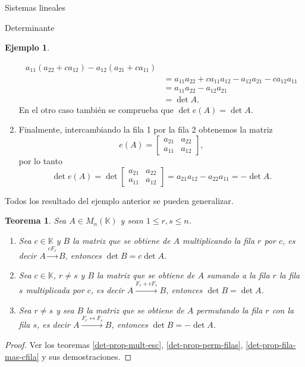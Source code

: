 \documentclass[a4paper,12pt,twoside,spanish]{amsbook}
\newtheorem{teorema}{Teorema}[section]
\theoremstyle{definition}
\newtheorem{ejemplo}{Ejemplo}[section]
\theoremstyle{remark}
\newcommand{\K}{\mathbb K}
\begin{document}
\begin{chapter}{Sistemas lineales}
\begin{section}{Determinante}
\begin{ejemplo}
\begin{enumerate}
\begin{align*}
				a_{11}(a_{22}+ ca_{12})- a_{12}( a_{21}+ ca_{11}) \\
				&= a_{11}a_{22}+ ca_{11}a_{12}- a_{12} a_{21}- ca_{12} a_{11}\\
				&= a_{11}a_{22}- a_{12} a_{21} \\
				&= \det A.
			\end{align*}
			En  el otro caso también se comprueba que $\det e(A) = \det A$. 
			\item Finalmente, intercambiando la fila 1 por la fila 2 obtenemos la matriz
			\begin{equation*}
			e(A)=\begin{bmatrix} a_{21}& a_{22}\\ a_{11}&a_{12}\end{bmatrix},
			\end{equation*}
			por lo tanto 
			\begin{equation*}
			\det e(A)= \det \begin{bmatrix} a_{21}& a_{22}\\ a_{11}&a_{12}\end{bmatrix} = a_{21}a_{12} - a_{22}a_{11} = -\det A.
			\end{equation*}
		\end{enumerate}
	\end{ejemplo}
	
	Todos los resultado del ejemplo anterior se pueden generalizar. 
	
	\begin{teorema} \label{det-prop-fundamentales}
		Sea $A  \in M_n(\K)$ y sean $1 \le r,s \le n$.
		\begin{enumerate}
			\item Sea $c \in \K$ y $B$ la matriz que se obtiene de $A$ multiplicando la fila $r$ por $c$, es decir $A  \stackrel{cF_r}{\longrightarrow} B$, entonces $\det B = c \det A$.
			\item  Sea $c \in \K$, $r \ne s$ y $B$ la matriz que se obtiene de $A$ sumando a la fila $r$ la fila $s$ multiplicada por $c$, es decir  $A  \stackrel{F_r + cF_s}{\longrightarrow} B$, entonces $\det B = \det A$.
			\item Sea $r \ne s$ y sea $B$ la matriz que se obtiene de $A$ permutando la fila $r$ con la fila $s$, es decir  $A  \stackrel{F_r \leftrightarrow F_s}{\longrightarrow}B$, entonces $\det B = -\det A$.
			
		\end{enumerate}
	\end{teorema}
	\begin{proof}
		Ver  los teoremas \ref{det-prop-mult-esc}, \ref{det-prop-perm-filas}, \ref{det-prop-fila-mas-cfila} y  sus demostraciones.
	\end{proof}


\end{section}
\end{chapter}
\end{document}
